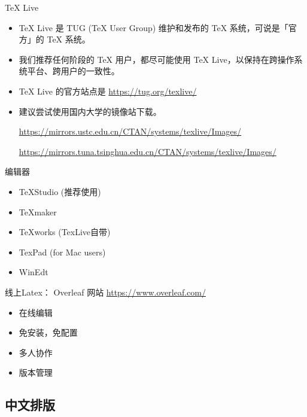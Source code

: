\documentclass[13pt]{ctexbeamer}
\begin{document}
\begin{frame}{TeX Live}

\begin{itemize}
	\item TeX Live 是 TUG (TeX User Group) 维护和发布的 TeX 系统，可说是「官方」的 TeX 系统。
	\item 我们推荐任何阶段的 TeX 用户，都尽可能使用 TeX Live，以保持在跨操作系统平台、跨用户的一致性。
	\item TeX Live 的官方站点是 \href{https://tug.org/texlive/}{https://tug.org/texlive/}
	\item 建议尝试使用国内大学的镜像站下载。
	
	\href{https://mirrors.ustc.edu.cn/CTAN/systems/texlive/Images/} {https://mirrors.ustc.edu.cn/CTAN/systems/texlive/Images/}
	
	
	\href{https://mirrors.tuna.tsinghua.edu.cn/CTAN/systems/texlive/Images/}{https://mirrors.tuna.tsinghua.edu.cn/CTAN/systems/texlive/Images/}
	
\end{itemize}
\end{frame} 


\begin{frame}{编辑器}
\begin{itemize}
\item  TeXStudio (推荐使用)
\item TeXmaker
\item TeXworks (TexLive自带)
\item TexPad (for Mac users)
\item WinEdt
\end{itemize}
\end{frame}






\begin{frame}{线上Latex：  Overleaf}
网站 
\href{https://www.overleaf.com/
}{https://www.overleaf.com/
}
\begin{itemize}
\item 在线编辑

\item 免安装，免配置

\item 多人协作

\item 版本管理
\end{itemize}
\end{frame}


  
\subsection{中文排版}
\end{document}
